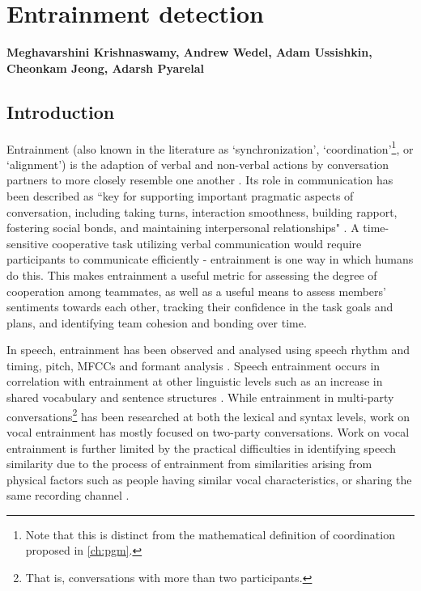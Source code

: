 \chapter{Entrainment detection}
\label{ch:entrainment}

\textbf{Meghavarshini Krishnaswamy, Andrew Wedel, Adam Ussishkin, Cheonkam
Jeong, Adarsh Pyarelal} 

\section{Introduction}

Entrainment (also known in the literature as `synchronization',
`coordination'\footnote{Note that this is distinct from the mathematical
definition of coordination proposed in \autoref{ch:pgm}.}, or `alignment') is
the adaption of verbal and non-verbal actions by conversation partners to more
closely resemble one another \citep{borrie2014}. Its role in communication has
been described as ``key for supporting important pragmatic aspects of
conversation, including taking turns, interaction smoothness, building rapport,
fostering social bonds, and maintaining interpersonal relationships"
\citep{borrie2019}.  A time-sensitive cooperative task utilizing verbal
communication would require participants to communicate efficiently -
entrainment is one way in which humans do this. This makes entrainment a useful
metric for assessing the degree of cooperation among teammates, as well as a
useful means to assess members' sentiments towards each other, tracking their
confidence in the task goals and plans, and identifying team cohesion and
bonding over time.

In speech, entrainment has been observed and analysed using speech rhythm and
timing, pitch, MFCCs and formant analysis
\citep{reichel2018prosodic,borrie2019syncing}. Speech entrainment occurs in
correlation with entrainment at other linguistic levels such as an increase in
shared vocabulary and sentence structures \citep{rahimi2017entrainment}.  While
entrainment in multi-party conversations\footnote{That is, conversations with
more than two participants.} has been researched at both the lexical and syntax
levels, work on vocal entrainment has mostly focused on two-party
conversations. Work on vocal entrainment is further limited by the practical
difficulties in identifying speech similarity due to the process of entrainment
from similarities arising from physical factors such as people having similar
vocal characteristics, or sharing the same recording channel \citep{nasir2020}.

